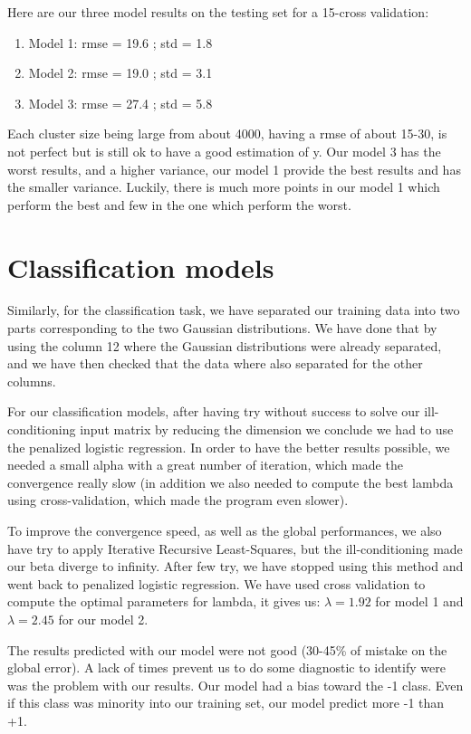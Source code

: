 \documentclass{article} %
\begin{document}
Here are our three model results on the testing set for a 15-cross validation:
\begin{enumerate}  
        \item Model 1:  rmse = 19.6      ; std = 1.8
        \item Model 2:  rmse = 19.0      ; std = 3.1
        \item Model 3:  rmse = 27.4      ; std = 5.8
\end{enumerate}

Each cluster size being large from about 4000, having a rmse of about 15-30, is not perfect but is still ok to have a good estimation of y. Our model 3 has the worst results, and a higher variance, our model 1 provide the best results and has the smaller variance. Luckily, there is much more points in our model 1 which perform the best and few in the one which perform the worst.

\section{Classification models}

Similarly, for the classification task, we have separated our training data into two parts corresponding to the two Gaussian distributions. We have done that by using the column 12 where the Gaussian distributions were already separated, and we have then checked that the data where also separated for the other columns.

For our classification models, after having try without success to solve our ill-conditioning input matrix by reducing the dimension we conclude we had to use the penalized logistic regression. In order to have the better results possible, we needed a small alpha with a great number of iteration, which made the convergence really slow (in addition we also needed to compute the best lambda using cross-validation, which made the program even slower).

To improve the convergence speed, as well as the global performances, we also have try to apply Iterative Recursive Least-Squares, but the ill-conditioning made our beta diverge to infinity. After few try, we have stopped using this method and went back to penalized logistic regression. We have used cross validation to compute the optimal parameters for lambda, it gives us: $\lambda=1.92$ for model 1 and $\lambda = 2.45$ for our model 2.

The results predicted with our model were not good (30-45\% of mistake on the global error). A lack of times prevent us to do some diagnostic to identify were was the problem with our results. Our model had a bias toward the -1 class. Even if this class was minority into our training set, our model predict more -1 than +1.
\end{document}
